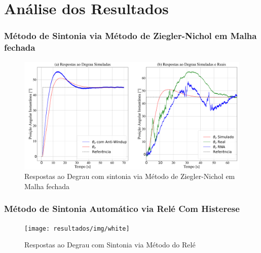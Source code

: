 \chapter{Análise dos Resultados}



\subsection{Método de Sintonia via Método de Ziegler-Nichol em Malha fechada}

\begin{figure}[H]
  \caption{Respostas ao Degrau com sintonia via Método de Ziegler-Nichol em Malha fechada}
  \begin{center}
      \includegraphics[scale=0.4]{resultados/img/pid_result}
  \end{center}
  \label{fig:mpu6050_analisys}
\end{figure}

\subsection{Método de Sintonia Automático via Relé Com Histerese}

\begin{figure}[H]
  \caption{Respostas ao Degrau com Sintonia via Método do Relé}
  \begin{center}
      \texttt{[image: resultados/img/white]}
  \end{center}
  \label{fig:mpu6050_analisys}
\end{figure}



